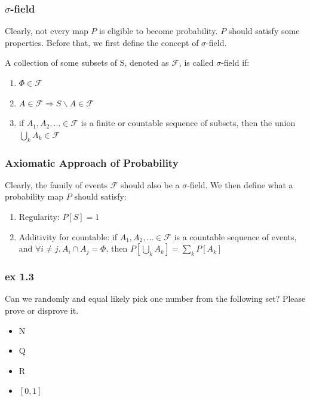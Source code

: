 \documentclass{beamer}
\begin{document}
\begin{frame}
    \frametitle{$\sigma$-field}
    Clearly, not every map $P$ is eligible to become probability. $P$ should satisfy some properties. Before that, we first define the concept of $\sigma$-field.\par

    A collection of some subsets of S, denoted as $\mathscr{F}$, is called $\sigma$-field if: 
    \begin{enumerate}
        \item $\varPhi  \in \mathscr{F}$
        \item $A\in \mathscr{F} \Rightarrow	S\backslash A \in \mathscr{F}$
        \item if $A_1, A_2, \dots \in \mathscr{F}$ is a finite or countable sequence of subsets, then the union $\bigcup\limits_{k}A_k \in \mathscr{F} $
    \end{enumerate}
\end{frame}

\begin{frame}
    \frametitle{Axiomatic Approach of Probability}
    Clearly, the family of events $\mathscr{F}$ should also be a $\sigma$-field. We then define what a probability map $P$ should satisfy:
    \begin{enumerate}
        \item Regularity: $P[S]=1$
        \item Additivity for countable: if $A_1, A_2, \dots \in \mathscr{F}$ is a countable sequence of events, and $\forall i\neq j, A_i \cap A_j=\varPhi$, then $P[\bigcup\limits_k A_k]=\sum\limits_{k}P[A_k]$
    \end{enumerate}

\end{frame}

\begin{frame}
    \frametitle{ex 1.3}
    Can we randomly and equal likely pick one number from the following set? Please prove or disprove it.
    \begin{itemize}
        \item N
        \item Q
        \item R
        \item $[0,1]$
    \end{itemize}
\end{frame}
\end{document}
